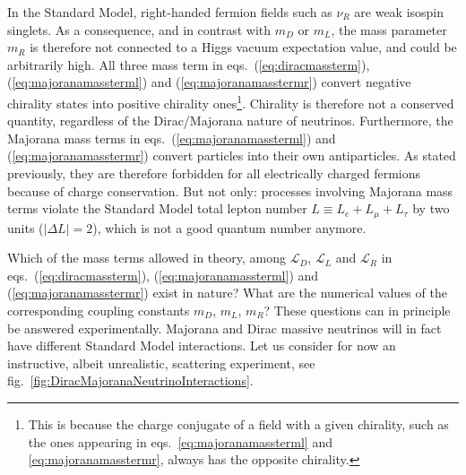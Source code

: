 In the Standard Model, right-handed fermion fields such as $\nu_R$ are weak isospin singlets. As a consequence, and in contrast with $m_D$ or $m_L$, the mass parameter $m_R$ is therefore not connected to a Higgs vacuum expectation value, and could be arbitrarily high. All three mass term in eqs.~(\ref{eq:diracmassterm}), (\ref{eq:majoranamassterml}) and (\ref{eq:majoranamasstermr}) convert negative chirality states into positive chirality ones\footnote{This is because the charge conjugate of a field with a given chirality, such as the ones appearing in eqs.~\ref{eq:majoranamassterml} and \ref{eq:majoranamasstermr}, always has the opposite chirality.}. Chirality is therefore not a conserved quantity, regardless of the Dirac/Majorana nature of neutrinos. Furthermore, the Majorana mass terms in eqs.~(\ref{eq:majoranamassterml}) and (\ref{eq:majoranamasstermr}) convert particles into their own antiparticles. As stated previously, they are therefore forbidden for all electrically charged fermions because of charge conservation. But not only: processes involving Majorana mass terms violate the Standard Model total lepton number $L\equiv L_e+L_{\mu}+L_{\tau}$ by two units ($\lvert\Delta L\rvert=2$), which is not a good quantum number anymore. 

Which of the mass terms allowed in theory, among $\mathcal{L}_D$, $\mathcal{L}_L$ and $\mathcal{L}_R$ in eqs.~(\ref{eq:diracmassterm}), (\ref{eq:majoranamassterml}) and (\ref{eq:majoranamasstermr}) exist in nature? What are the numerical values of the corresponding coupling constants $m_D$, $m_L$, $m_R$? These questions can in principle be answered experimentally. Majorana and Dirac massive neutrinos will in fact have different Standard Model interactions. Let us consider for now an instructive, albeit unrealistic, scattering experiment, see fig.~\ref{fig:DiracMajoranaNeutrinoInteractions}.

